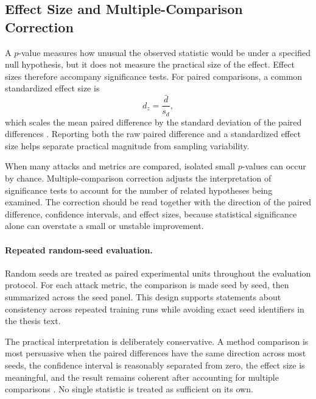 \subsection{Effect Size and Multiple-Comparison Correction}

A $p$-value measures how unusual the observed statistic would be under a specified null hypothesis, but it does not measure the practical size of the effect. Effect sizes therefore accompany significance tests. For paired comparisons, a common standardized effect size is
\[
d_z=\frac{\bar{d}}{s_d},
\]
which scales the mean paired difference by the standard deviation of the paired differences \cite{cohen1988statistical}. Reporting both the raw paired difference and a standardized effect size helps separate practical magnitude from sampling variability.

When many attacks and metrics are compared, isolated small $p$-values can occur by chance. Multiple-comparison correction adjusts the interpretation of significance tests to account for the number of related hypotheses being examined. The correction should be read together with the direction of the paired difference, confidence intervals, and effect sizes, because statistical significance alone can overstate a small or unstable improvement.

\paragraph{Repeated random-seed evaluation.}
Random seeds are treated as paired experimental units throughout the evaluation protocol. For each attack metric, the comparison is made seed by seed, then summarized across the seed panel. This design supports statements about consistency across repeated training runs while avoiding exact seed identifiers in the thesis text.

The practical interpretation is deliberately conservative. A method comparison is most persuasive when the paired differences have the same direction across most seeds, the confidence interval is reasonably separated from zero, the effect size is meaningful, and the result remains coherent after accounting for multiple comparisons \cite{cumming2014new}. No single statistic is treated as sufficient on its own.
